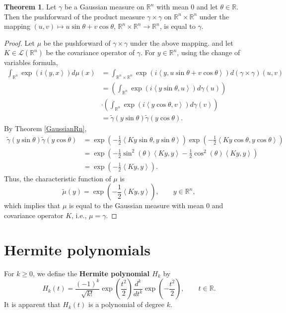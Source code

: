\documentclass{article}
\newcommand{\inner}[2]{\left\langle #1, #2 \right\rangle}
\theoremstyle{definition}
\newtheorem{theorem}{Theorem}
\theoremstyle{definition}
\begin{document}
\begin{theorem}
Let $\gamma$ be a Gaussian measure on $\mathbb{R}^n$ with mean $0$ and let $\theta \in \mathbb{R}$.
Then the pushforward of the product measure $\gamma \times \gamma$ on $\mathbb{R}^n \times \mathbb{R}^n$
under the mapping $(u,v) \mapsto u \sin \theta + v \cos\theta$, $\mathbb{R}^n \times \mathbb{R}^n \to
\mathbb{R}^n$, is equal to $\gamma$. 
\label{sincos}
\end{theorem}
\begin{proof}
Let $\mu$ be the pushforward of $\gamma \times \gamma$ under the above mapping. 
and let $K \in \mathscr{L}(\mathbb{R}^n)$ be the covariance operator of $\gamma$.
For $y \in \mathbb{R}^n$, using the change of variables formula,
\begin{align*}
\int_{\mathbb{R}^n} \exp\left( i \inner{y}{x} \right) d\mu(x)&=\int_{\mathbb{R}^n \times \mathbb{R}^n} \exp\left(i\inner{y}{u \sin \theta + v \cos\theta}\right)
d(\gamma \times \gamma)(u,v)\\
&=\left(\int_{\mathbb{R}^n} \exp\left(i  \inner{y \sin \theta}{u} \right) d\gamma(u) \right)\\
&\cdot \left(\int_{\mathbb{R}^n} \exp\left(i  \inner{y \cos \theta}{v} \right) d\gamma(v) \right)\\
&=\widetilde{\gamma}(y\sin\theta) \widetilde{\gamma}(y\cos\theta).
\end{align*}
By Theorem \ref{GaussianRn},
\begin{align*}
\widetilde{\gamma}(y\sin\theta) \widetilde{\gamma}(y\cos\theta)&=\exp\left(-\frac{1}{2}\inner{Ky\sin\theta}{y\sin\theta} \right)
\exp\left(-\frac{1}{2}\inner{Ky\cos\theta}{y\cos\theta} \right)\\
&=\exp\left(-\frac{1}{2}\sin^2 (\theta) \inner{Ky}{y}-\frac{1}{2}\cos^2(\theta) \inner{Ky}{y} \right)\\
&=\exp\left(-\frac{1}{2}\inner{Ky}{y}\right).
\end{align*}
Thus, the characteristic function of $\mu$ is
\[
\widetilde{\mu}(y) = \exp\left(-\frac{1}{2}\inner{Ky}{y}\right), \qquad y \in \mathbb{R}^n,
\]
which implies that $\mu$ is equal to the Gaussian measure with mean $0$ and covariance operator $K$, i.e.,
$\mu=\gamma$. 
\end{proof}



\section{Hermite polynomials}
For $k \geq 0$, we define the \textbf{Hermite polynomial $H_k$} by
\[
H_k(t) = \frac{(-1)^k}{\sqrt{k!}} \exp\left(\frac{t^2}{2}\right) \frac{d^k}{dt^k} \exp\left(-\frac{t^2}{2}\right),
\qquad t \in \mathbb{R}.
\]
It is apparent that $H_k(t)$ is a polynomial of  degree $k$. 
\end{document}
